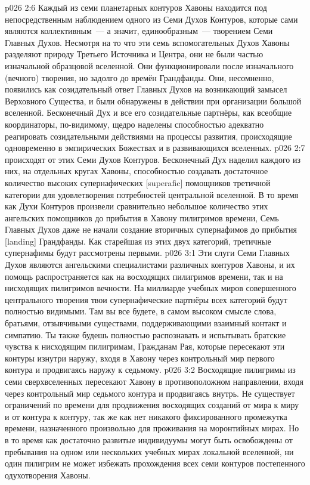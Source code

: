 \vs p026 2:6 \pc Каждый из семи планетарных контуров Хавоны находится под непосредственным наблюдением одного из Семи Духов Контуров, которые сами являются коллективным~--- а значит, единообразным~--- творением Семи Главных Духов. Несмотря на то что эти семь вспомогательных Духов Хавоны разделяют природу Третьего Источника и Центра, они не были частью изначальной образцовой вселенной. Они функционировали после изначального (вечного) творения, но задолго до времён Грандфанды. Они, несомненно, появились как созидательный ответ Главных Духов на возникающий замысел Верховного Существа, и были обнаружены в действии при организации большой вселенной. Бесконечный Дух и все его созидательные партнёры, как всеобщие координаторы, по\hyp{}видимому, щедро наделены способностью адекватно реагировать созидательными действиями на процессы развития, происходящие одновременно в эмпирических Божествах и в развивающихся вселенных.
\vs p026 2:7 \pc {} происходят от этих Семи Духов Контуров. Бесконечный Дух наделил каждого из них, на отдельных кругах Хавоны, способностью создавать достаточное количество высоких супернафических [superafic] помощников третичной категории для удовлетворения потребностей центральной вселенной. В то время как Духи Контуров произвели сравнительно небольшое количество этих ангельских помощников до прибытия в Хавону пилигримов времени, Семь Главных Духов даже не начали создание вторичных супернафимов до прибытия [landing] Грандфанды. Как старейшая из этих двух категорий, третичные супернафимы будут рассмотрены первыми.
\vs p026 3:1 Эти слуги Семи Главных Духов являются ангельскими специалистами различных контуров Хавоны, и их помощь распространяется как на восходящих пилигримов времени, так и на нисходящих пилигримов вечности. На миллиарде учебных миров совершенного центрального творения твои супернафические партнёры всех категорий будут полностью видимыми. Там вы все будете, в самом высоком смысле слова, братьями, отзывчивыми существами, поддерживающими взаимный контакт и симпатию. Ты также будешь полностью распознавать и испытывать братские чувства к нисходящим пилигримам, Гражданам Рая, которые пересекают эти контуры изнутри наружу, входя в Хавону через контрольный мир первого контура и продвигаясь наружу к седьмому.
\vs p026 3:2 Восходящие пилигримы из семи сверхвселенных пересекают Хавону в противоположном направлении, входя через контрольный мир седьмого контура и продвигаясь внутрь. Не существует ограничений по времени для продвижения восходящих созданий от мира к миру и от контура к контуру, так же как нет никакого фиксированного промежутка времени, назначенного произвольно для проживания на моронтийных мирах. Но в то время как достаточно развитые индивидуумы могут быть освобождены от пребывания на одном или нескольких учебных мирах локальной вселенной, ни один пилигрим не может избежать прохождения всех семи контуров постепенного одухотворения Хавоны.
